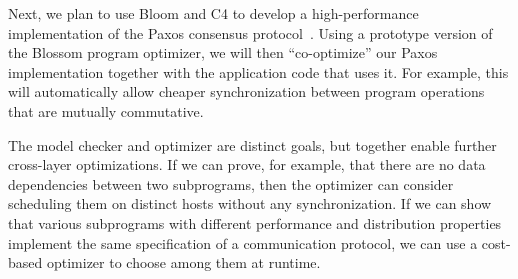 Next, we plan to use Bloom and C4 to develop a high-performance implementation
of the Paxos consensus protocol~\cite{netdb,part-time}. Using a prototype version of the
Blossom program optimizer, we will then ``co-optimize'' our Paxos implementation
together with the application code that uses it. For example, this will
automatically allow cheaper synchronization between program operations that are
mutually commutative.

The model checker and optimizer are distinct goals, but together enable further
cross-layer optimizations.  If we can prove, for example, that there are no data
dependencies between two subprograms, then the optimizer can consider scheduling
them on distinct hosts without any synchronization.  If we can show that various
subprograms with different performance and distribution properties implement the
same specification of a communication protocol, we can use a cost-based
optimizer to choose among them at runtime.
